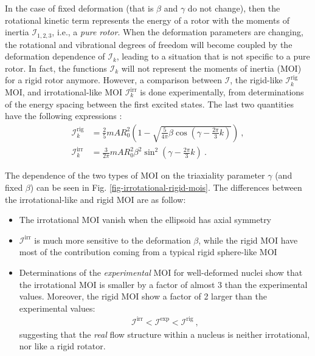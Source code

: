 In the case of fixed deformation (that is $\beta$ and $\gamma$ do not change), then the rotational kinetic term represents the energy of a rotor with the moments of inertia $\mathcal{I}_{1,2,3}$, i.e., a \emph{pure rotor}. When the deformation parameters are changing, the rotational and vibrational degrees of freedom will become coupled by the deformation dependence of $\mathcal{I}_k$, leading to a situation that is not specific to a pure rotor. In fact, the functions $\mathcal{I}_k$ will not represent the moments of inertia (MOI) for a rigid rotor anymore. However, a comparison between $\mathcal{I}$, the rigid-like $\mathcal{I}_k^\text{rig}$ MOI, and irrotational-like MOI $\mathcal{I}_k^\text{irr}$ is done experimentally, from determinations of the energy spacing between the first excited states. The last two quantities have the following expressions \cite{bohr1954rotational,ring2004nuclear}:
\begin{align}
    \mathcal{I}_k^\text{rig}&=\frac{2}{5}mAR_0^2\left(1-\sqrt{\frac{5}{4\pi}\beta\cos\left(\gamma-\frac{2\pi}{3}k\right)}\right)\ ,\\
    \mathcal{I}_k^\text{irr}&=\frac{3}{2\pi}mAR_0^2\beta^2\sin^2\left(\gamma-\frac{2\pi}{3}k\right)\ .
    \label{eq-irrotational-rigid-mois}
\end{align}

The dependence of the two types of MOI on the triaxiality parameter $\gamma$ (and fixed $\beta$) can be seen in Fig. \ref{fig-irrotational-rigid-mois}. The differences between the irrotational-like and rigid MOI are as follow:
\begin{itemize}
    \item The irrotational MOI vanish when the ellipsoid has axial symmetry
    \item $\mathcal{I}^\text{irr}$ is much more sensitive to the deformation $\beta$, while the rigid MOI have most of the contribution coming from a typical rigid sphere-like MOI
    \item Determinations of the \emph{experimental} MOI for well-deformed nuclei show that the irrotational MOI is smaller by a factor of almost 3 than the experimental values. Moreover, the rigid MOI show a factor of 2 larger than the experimental values:
    \begin{align}
        \mathcal{I}^\text{irr}<\mathcal{I}^\text{exp}<\mathcal{I}^\text{rig}\ ,
        \label{experimental-MOI-vs-rig-irr}
    \end{align}
    suggesting that the \emph{real} flow structure within a nucleus is neither irrotational, nor like a rigid rotator.
\end{itemize}

